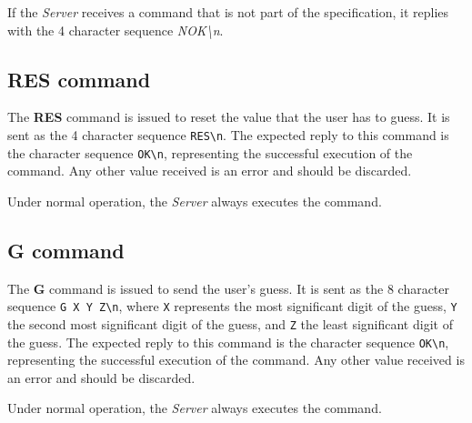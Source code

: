 \documentclass[conference, a4paper]{IEEEtran}
\begin{document}
If the \textit{Server} receives a command that is not part of the specification, it replies with the 4 character sequence \textit{NOK\textbackslash n}.

\subsection{RES command}
The \textbf{RES} command is issued to reset the value that the user has to guess. It is sent as the 4 character sequence \texttt{RES\textbackslash n}. The expected reply to this command is the character sequence \texttt{OK\textbackslash n}, representing the successful execution of the command. Any other value received is an error and should be discarded.

Under normal operation, the \textit{Server} always executes the command.

\subsection{G command}
The \textbf{G} command is issued to send the user's guess. It is sent as the 8 character sequence \texttt{G X Y Z\textbackslash n}, where \texttt{X} represents the most significant digit of the guess, \texttt{Y} the second most significant digit of the guess, and \texttt{Z} the least significant digit of the guess. The expected reply to this command is the character sequence \texttt{OK\textbackslash n}, representing the successful execution of the command. Any other value received is an error and should be discarded.

Under normal operation, the \textit{Server} always executes the command.
\end{document}
